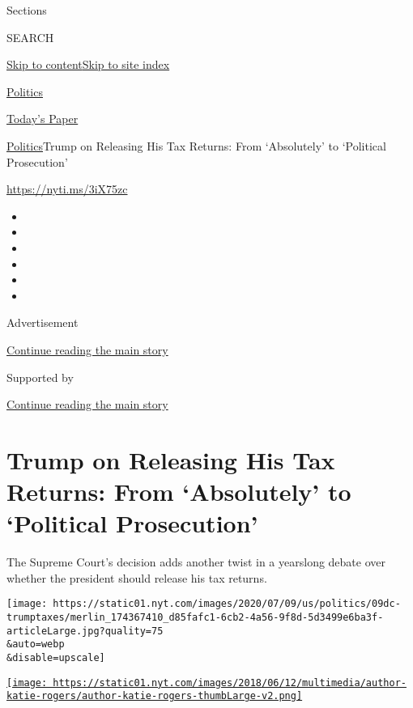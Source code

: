 Sections

SEARCH

\protect\hyperlink{site-content}{Skip to
content}\protect\hyperlink{site-index}{Skip to site index}

\href{https://www.nytimes.com/section/politics}{Politics}

\href{https://myaccount.nytimes.com/auth/login?response_type=cookie\&client_id=vi}{}

\href{https://www.nytimes.com/section/todayspaper}{Today's Paper}

\href{/section/politics}{Politics}\textbar{}Trump on Releasing His Tax
Returns: From `Absolutely' to `Political Prosecution'

\url{https://nyti.ms/3iX75zc}

\begin{itemize}
\item
\item
\item
\item
\item
\item
\end{itemize}

Advertisement

\protect\hyperlink{after-top}{Continue reading the main story}

Supported by

\protect\hyperlink{after-sponsor}{Continue reading the main story}

\hypertarget{trump-on-releasing-his-tax-returns-from-absolutely-to-political-prosecution}{%
\section{Trump on Releasing His Tax Returns: From `Absolutely' to
`Political
Prosecution'}\label{trump-on-releasing-his-tax-returns-from-absolutely-to-political-prosecution}}

The Supreme Court's decision adds another twist in a yearslong debate
over whether the president should release his tax returns.

\texttt{[image: https://static01.nyt.com/images/2020/07/09/us/politics/09dc-trumptaxes/merlin\_174367410\_d85fafc1-6cb2-4a56-9f8d-5d3499e6ba3f-articleLarge.jpg?quality=75\\\&auto=webp\\\&disable=upscale]}

\href{https://www.nytimes.com/by/katie-rogers}{\texttt{[image: https://static01.nyt.com/images/2018/06/12/multimedia/author-katie-rogers/author-katie-rogers-thumbLarge-v2.png]}}

